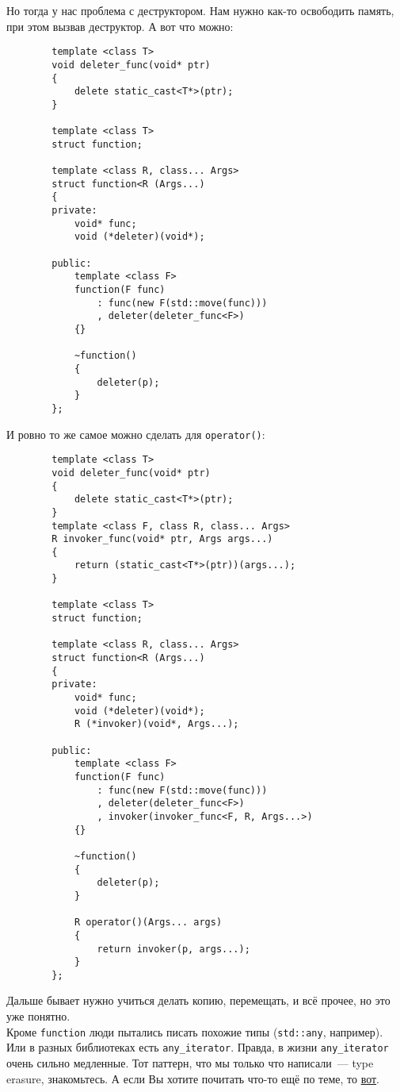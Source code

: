 \documentclass{article}
\begin{document}
    Но тогда у нас проблема с деструктором. Нам нужно как-то освободить память, при этом вызвав деструктор. А вот что можно:
    \begin{verbatim}
        template <class T>
        void deleter_func(void* ptr)
        {
            delete static_cast<T*>(ptr);
        }

        template <class T>
        struct function;
        
        template <class R, class... Args>
        struct function<R (Args...)
        {
        private:
            void* func;
            void (*deleter)(void*);
            
        public:
            template <class F>
            function(F func)
                : func(new F(std::move(func)))
                , deleter(deleter_func<F>)
            {}

            ~function()
            {
                deleter(p);
            }
        };
    \end{verbatim}
    И ровно то же самое можно сделать для \texttt{operator()}:
    \begin{verbatim}
        template <class T>
        void deleter_func(void* ptr)
        {
            delete static_cast<T*>(ptr);
        }
        template <class F, class R, class... Args>
        R invoker_func(void* ptr, Args args...)
        {
            return (static_cast<T*>(ptr))(args...);
        }
        
        template <class T>
        struct function;
        
        template <class R, class... Args>
        struct function<R (Args...)
        {
        private:
            void* func;
            void (*deleter)(void*);
            R (*invoker)(void*, Args...);
            
        public:
            template <class F>
            function(F func)
                : func(new F(std::move(func)))
                , deleter(deleter_func<F>)
                , invoker(invoker_func<F, R, Args...>)
            {}

            ~function()
            {
                deleter(p);
            }

            R operator()(Args... args)
            {
                return invoker(p, args...);
            }
        };
    \end{verbatim}
    Дальше бывает нужно учиться делать копию, перемещать, и всё прочее, но это уже понятно.\\
    Кроме \texttt{function} люди пытались писать похожие типы (\texttt{std::any}, например). Или в разных библиотеках есть \texttt{any_iterator}. Правда, в жизни \texttt{any_iterator} очень сильно медленные. Тот паттерн, что мы только что написали~--- type erasure, знакомьтесь. А если Вы хотите почитать что-то ещё по теме, то \href{https://github.com/boostcon/2010_presentations/blob/master/thu/type_erasure_pattern_boostcon.pdf}{вот}.
\end{document}

